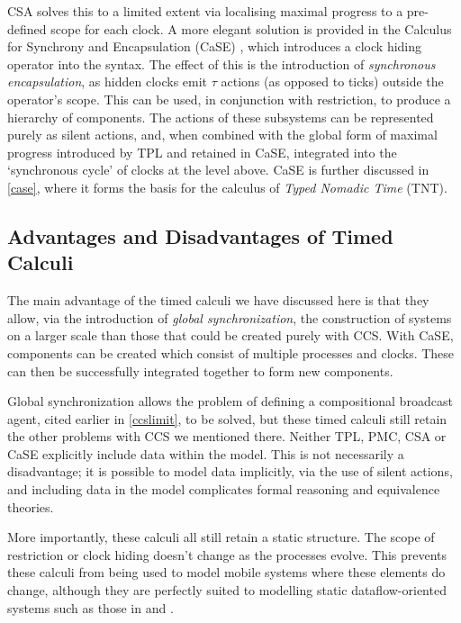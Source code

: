 CSA solves this to a limited extent via localising maximal progress to
a pre-defined scope for each clock.  A more elegant solution is
provided in the Calculus for Synchrony and Encapsulation (CaSE)
\cite{CaSE}, which introduces a clock hiding operator into the syntax.
The effect of this is the introduction of \emph{synchronous
  encapsulation}, as hidden clocks emit $\tau$ actions (as opposed to
ticks) outside the operator's scope.  This can be used, in conjunction
with restriction, to produce a hierarchy of components.  The actions
of these subsystems can be represented purely as silent actions, and,
when combined with the global form of maximal progress introduced by
TPL and retained in CaSE, integrated into the `synchronous cycle'
\cite{CaSE} of clocks at the level above.  CaSE is further discussed
in \ref{case}, where it forms the basis for the calculus of
\emph{Typed Nomadic Time} (TNT).

\subsection{Advantages and Disadvantages of Timed Calculi}
\label{timelimit}

The main advantage of the timed calculi we have discussed here is that
they allow, via the introduction of \emph{global synchronization}, the
construction of systems on a larger scale than those that could be
created purely with CCS.  With CaSE, components can be created which
consist of multiple processes and clocks.  These can then be
successfully integrated together to form new components.

Global synchronization allows the problem of defining a compositional
broadcast agent, cited earlier in \ref{ccslimit}, to be solved, but
these timed calculi still retain the other problems with CCS we
mentioned there.  Neither TPL, PMC, CSA or CaSE explicitly include
data within the model.  This is not necessarily a disadvantage; it is
possible to model data implicitly, via the use of silent actions, and
including data in the model complicates formal reasoning and
equivalence theories.

More importantly, these calculi all still retain a static structure.
The scope of restriction or clock hiding doesn't change as the
processes evolve.  This prevents these calculi from being used to
model mobile systems where these elements do change, although they
are perfectly suited to modelling static dataflow-oriented systems
such as those in \cite{WICSA} and \cite{cashews-sem}.

